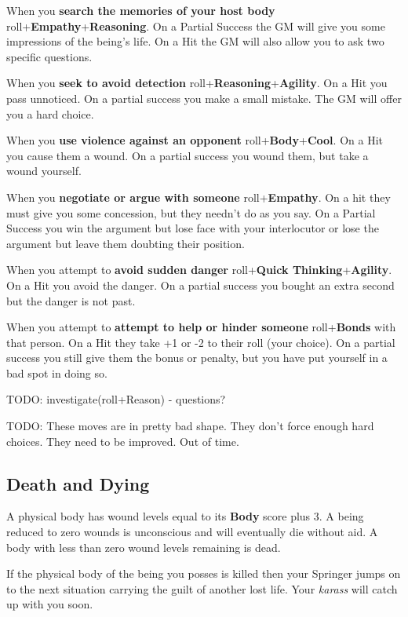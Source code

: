 \documentclass[letterpaper,12pt,landscape,twocolumn]{book}
\begin{document}
When you \textbf{search the memories of your host body}
roll+\textbf{Empathy}+\textbf{Reasoning}. On a Partial Success the GM
will give you some impressions of the being's life. On a Hit the GM
will also allow you to ask two specific questions. 

When you \textbf{seek to avoid detection}
roll+\textbf{Reasoning}+\textbf{Agility}. On a Hit you pass
unnoticed. On a partial success you make a small mistake. The GM will
offer you a hard choice. 

When you \textbf{use violence against an opponent}
roll+\textbf{Body}+\textbf{Cool}. On a Hit you cause them a wound. On
a partial success you wound them, but take a wound yourself.

When you \textbf{negotiate or argue with someone}
roll+\textbf{Empathy}. On a hit they must give you some
concession, but they needn't do as you say. On a Partial Success you
win the argument but lose face with your interlocutor or lose the
argument but leave them doubting their position.   

When you attempt to \textbf{avoid sudden danger}
roll+\textbf{Quick Thinking}+\textbf{Agility}. On a Hit you avoid the
danger. On a partial success you bought an extra second but the danger
is not past. 

When you attempt to \textbf{attempt to help or hinder someone}
roll+\textbf{Bonds} with that person. On a Hit they take +1 or -2 to
their roll (your choice). On a partial success you still give them the
bonus or penalty, but you have put yourself in a bad spot in doing so. 

TODO: investigate(roll+Reason) - questions?

TODO: These moves are in pretty bad shape. They don't force enough
hard choices. They need to be improved. Out of time.

\subsection{Death and Dying}

A physical body has wound levels equal to its \textbf{Body} score plus
3. A being reduced to zero wounds is unconscious and will eventually
die without aid. A body with less than zero wound levels remaining is
dead. 

If the physical body of the being you posses is killed then your
Springer jumps on to the next situation carrying the guilt of another
lost life. Your \textit{karass} will catch up with you soon. 
\end{document}
